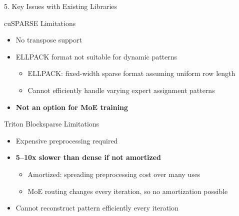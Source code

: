\documentclass[11pt]{beamer}
\begin{document}
\begin{frame}{5. Key Issues with Existing Libraries}
    \begin{alertblock}{cuSPARSE Limitations}
    \begin{itemize}
        \item No transpose support
        \item ELLPACK format not suitable for dynamic patterns
        \begin{itemize}
            \scriptsize
            \item ELLPACK: fixed-width sparse format assuming uniform row length
            \item Cannot efficiently handle varying expert assignment patterns
        \end{itemize}
        \item \textbf{Not an option for MoE training}
    \end{itemize}
    \end{alertblock}
    
    \begin{alertblock}{Triton Blocksparse Limitations}
    \begin{itemize}
        \item Expensive preprocessing required
        \item \textbf{5--10x slower than dense if not amortized}
        \begin{itemize}
            \scriptsize
            \item Amortized: spreading preprocessing cost over many uses
            \item MoE routing changes every iteration, so no amortization possible
        \end{itemize}
        \item Cannot reconstruct pattern efficiently every iteration
    \end{itemize}
    \end{alertblock}
\end{frame}
\end{document}
